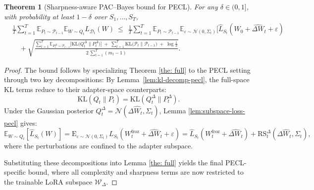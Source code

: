 \documentclass[10pt]{article} %
\newtheorem{theorem}{Theorem}
\begin{document}
\begin{theorem}[Sharpness-aware PAC--Bayes bound for PECL]

For any $\delta\in(0,1]$, with probability at least $1-\delta$ over $S_1,\ldots,S_T$,
\begin{equation}\label{eq:pecl-main}
\begin{aligned}
&\frac{1}{T}\sum_{t=1}^T
\mathbb{E}_{P_t\sim\mathcal P_{t-1}}\mathbb{E}_{W\sim Q_t}L_{\mathcal{D}_t}(W)
\ \le\
\ \frac{1}{T}\sum_{t=1}^T
\mathbb{E}_{P_t\sim\mathcal P_{t-1}}
\mathbb{E}_{\varepsilon \sim \mathcal{N}(0, \Sigma_t)}[\hat{L}_{S_t}(W_0 + \widehat{\Delta W}_t + \varepsilon)
\\
&\quad +\sqrt{\frac{
\displaystyle \sum_{t=1}^T \mathbb{E}_{P_t^\Delta\sim\mathcal P_{t-1}}\!\Big[\mathrm{KL}\!\big(Q_t^\Delta\|P_t^\Delta\big)\Big]
\;+\;\displaystyle \sum_{t=1}^T \mathrm{KL}\!\big(\mathcal P_t\|\mathcal P_{t-1}\big)
\;+\;\log\!\frac{1}{\delta}
}{2\,\displaystyle\sum_{t=1}^T (m_t-1)}}.
\end{aligned}
\end{equation}
\end{theorem}



\begin{proof}
The bound follows by specializing Theorem \ref{the: full} to the PECL setting through two key decompositions:
By Lemma~\ref{lem:kl-decomp-pecl}, the full-space KL terms reduce to their adapter-space counterparts:
\[
\mathrm{KL}(Q_t \| P_t) = \mathrm{KL}(Q_t^\Delta \| P_t^\Delta).
\]
Under the Gaussian posterior $Q_t^\Delta = \mathcal{N}(\Delta\hat{W}_t, \Sigma_t)$, Lemma \ref{lem:subspace-loss-pecl} gives:
\[
\mathbb{E}_{W \sim Q_t}[\hat{L}_{S_t}(W)] 
= \mathrm{E}_{\varepsilon \sim \mathcal{N}(0, \Sigma_t)}{L}_{S_t}(W^{\mathrm{froz}}_t+\widehat{\Delta W}_t + \varepsilon)
 = \hat{L}_{S_t}(W^{\mathrm{froz}}_t + \widehat{\Delta{W}_t}) + \mathrm{RS}_t^\Delta(\Delta\widehat{W}_t, \Sigma_t),
\]
where the perturbations are confined to the adapter subspace.

Substituting these decompositions into Lemma \ref{the: full} yields the final PECL-specific bound, where all complexity and sharpness terms are now restricted to the trainable LoRA subspace $\mathcal{W}_\Delta$.

\end{proof}
\end{document}
